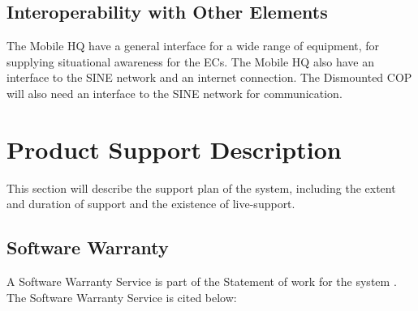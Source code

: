 \subsection{Interoperability with Other Elements}
The Mobile HQ have a general interface for a wide range of equipment, for supplying situational awareness for the ECs. The Mobile HQ also have an interface to the SINE network and an internet connection. The Dismounted COP will also need an interface to the SINE network for communication.

\newpage
\section{Product Support Description}
This section will describe the support plan of the system, including the extent and duration of support and the existence of live-support. 

\subsection{Software Warranty}
A Software Warranty Service is part of the Statement of work for the system \cite{Casebook}. The Software Warranty Service is cited below: \\

